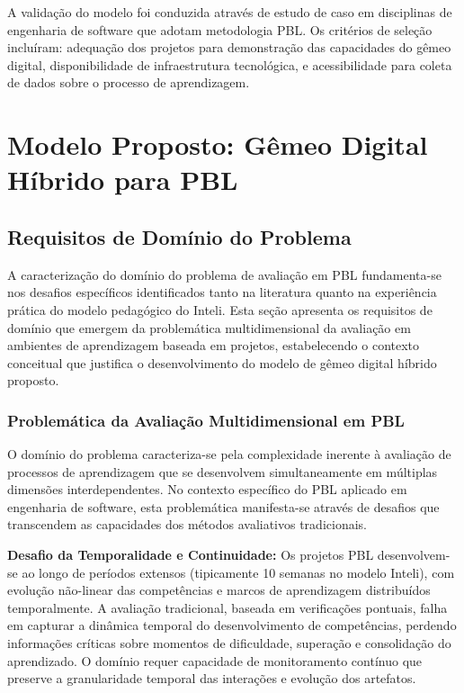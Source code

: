 \documentclass[english, spanish, brazilian]{modelo_dt}
\begin{document}
A validação do modelo foi conduzida através de estudo de caso em disciplinas de engenharia de software que adotam metodologia PBL\@. Os critérios de seleção incluíram: adequação dos projetos para demonstração das capacidades do gêmeo digital, disponibilidade de infraestrutura tecnológica, e acessibilidade para coleta de dados sobre o processo de aprendizagem\@.

\section{Modelo Proposto: Gêmeo Digital Híbrido para PBL}

\subsection{Requisitos de Domínio do Problema}

A caracterização do domínio do problema de avaliação em PBL fundamenta-se nos desafios específicos identificados tanto na literatura quanto na experiência prática do modelo pedagógico do Inteli. Esta seção apresenta os requisitos de domínio que emergem da problemática multidimensional da avaliação em ambientes de aprendizagem baseada em projetos, estabelecendo o contexto conceitual que justifica o desenvolvimento do modelo de gêmeo digital híbrido proposto.

\subsubsection{Problemática da Avaliação Multidimensional em PBL}

O domínio do problema caracteriza-se pela complexidade inerente à avaliação de processos de aprendizagem que se desenvolvem simultaneamente em múltiplas dimensões interdependentes. No contexto específico do PBL aplicado em engenharia de software, esta problemática manifesta-se através de desafios que transcendem as capacidades dos métodos avaliativos tradicionais.

\textbf{Desafio da Temporalidade e Continuidade:} Os projetos PBL desenvolvem-se ao longo de períodos extensos (tipicamente 10 semanas no modelo Inteli), com evolução não-linear das competências e marcos de aprendizagem distribuídos temporalmente. A avaliação tradicional, baseada em verificações pontuais, falha em capturar a dinâmica temporal do desenvolvimento de competências, perdendo informações críticas sobre momentos de dificuldade, superação e consolidação do aprendizado. O domínio requer capacidade de monitoramento contínuo que preserve a granularidade temporal das interações e evolução dos artefatos.
\end{document}
